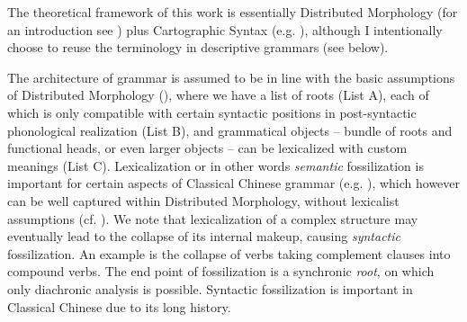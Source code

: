 \documentclass[UTF8, a4paper, oneside, scheme=plain, 12pt]{ctexrep}
\begin{document}
{\small
The theoretical framework of this work is essentially Distributed Morphology (for an introduction see \citet{siddiqi2009syntax}) plus Cartographic Syntax (e.g. \citet{cinque1999adverbs}),
although I intentionally choose to reuse the terminology in descriptive grammars (see below).

The architecture of grammar is assumed to be in line with the basic assumptions of Distributed Morphology (),
where we have a list of roots (List A),
each of which is only compatible with certain syntactic positions in post-syntactic phonological realization (List B),
and grammatical objects -- bundle of roots and functional heads, or even larger objects -- can be lexicalized with custom meanings (List C).
Lexicalization or in other words \emph{semantic} fossilization is important for certain aspects of Classical Chinese grammar (e.g. ),
which however can be well captured within Distributed Morphology,
without lexicalist assumptions (cf. \citealt{bruening2018lexicalist}).
We note that lexicalization of a complex structure may eventually lead to the collapse of its internal makeup, causing \emph{syntactic} fossilization.
An example is the collapse of verbs taking complement clauses into compound verbs.
The end point of fossilization is a synchronic \emph{root},
on which only diachronic analysis is possible.
Syntactic fossilization is important in Classical Chinese due to its long history.

}
\end{document}
